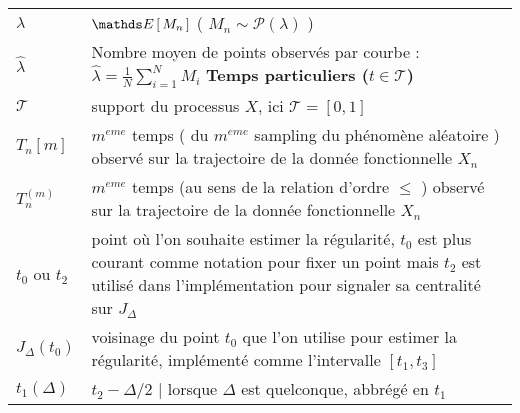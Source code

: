 \begin{table}[H]
\begin{tabularx}{\textwidth}{lX}
		\midrule
		$\lambda$         & $\esperance{M_n}$ ( $M_n \sim \mathcal P(\lambda)$ )                                                                                                                                                                                                    \\
		$\widehat \lambda$ & Nombre moyen de points observés par courbe : $\widehat \lambda = \frac 1 N \sum\limits_{i=1}^N M_i$
		\midrule
		\textbf{Temps particuliers ($t \in \mathcal T$)}                                                                                                                                                                                                                            \\
		\midrule
		$\mathcal T$      & support du processus $X$, ici $\mathcal T = [0,1]$                                                                                                                                                                                                      \\
		$T_n[m]$          & $m^{eme}$ temps ( du $m^{eme}$ sampling du phénomène aléatoire ) observé sur la trajectoire de la donnée fonctionnelle $X_n$                                                                                                                            \\
		$T_n^{(m)}$       & $m^{eme}$ temps (au sens de la relation d'ordre $\leq$ ) observé sur la trajectoire de la donnée fonctionnelle $X_n$                                                                                                                                    \\
		$t_0$ ou $t_2$    & point où l'on souhaite estimer la régularité, $t_0$ est plus courant comme notation pour fixer un point mais $t_2$ est utilisé dans l'implémentation pour signaler sa centralité sur $J_\Delta$                                                         \\
		$J_\Delta(t_0)$   & \og voisinage \fg du point $t_0$ que l'on utilise pour estimer la régularité, implémenté comme l'intervalle $[t_1, t_3]$                                                                                                                                \\
		$t_1(\Delta)$     & $t_2 - \Delta/2$ | lorsque $\Delta$ est quelconque, abbrégé en $t_1$                                                                                                                                                                                    \\

\end{tabularx}
\end{table}
